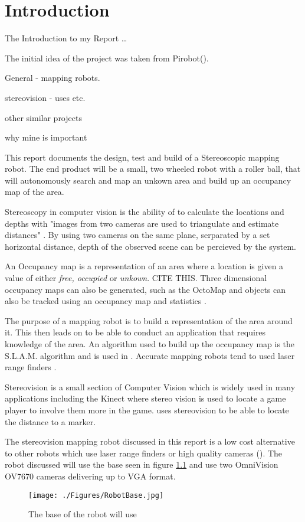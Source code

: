 \chapter{Introduction} \label{Chapter:Introduction}
The Introduction to my Report \dots

The initial idea of the project was taken from Pirobot(\cite{Pirobot}).

General - mapping robots. 

stereovision - uses etc.

other similar projects

why mine is important 


This report documents the design, test and build of a Stereoscopic mapping robot. The end product will be a small, two wheeled robot with a roller ball, that will autonomously search and map an unkown area and build up an occupancy map of the area. 

Stereoscopy in computer vision is the ability of to calculate the locations and depths with "images from two cameras are used to triangulate and estimate distances" \cite{Saxena:DepthEstimation}. By using two cameras on the same plane, serparated by a set horizontal distance, depth of the observed scene can be percieved by the system.

An Occupancy map is a representation of an area where a location is given a value of either \textit{free, occupied} or \textit{unkown}. CITE THIS. Three dimensional occupancy maps can also be generated, such as the OctoMap\cite{octomap} and objects can also be tracked using an occupancy map and statistics \cite{Fleuret:OccupancyMap}. 

The purpose of a mapping robot is to build a representation of the area around it. This then leads on to be able to conduct an application that requires knowledge of the area. An algorithm used to build up the occupancy map is the S.L.A.M. algorithm \cite{Thrun:SLAM} and is used in \cite{Se:MappingRobot}. Accurate mapping robots tend to used laser range finders \cite{Ruhnke:LaserMapping}.

Stereovision is a small section of Computer Vision which is widely used in many applications including the Kinect \cite{Microsoft:Kinect} where stereo vision is used to locate a game player to involve them more in the game. \cite{Mrovlje:Distance_Stereoscopic} uses stereovision to be able to locate the distance to a marker.

The stereovision mapping robot discussed in this report is a low cost alternative to other robots which use laser range finders or high quality cameras (\cite{Se:MappingRobot}). The robot discussed will use the base seen in figure \ref{fig:RobotBase} and use two OmniVision OV7670 cameras delivering up to VGA format.

\begin{figure}
\texttt{[image: ./Figures/RobotBase.jpg]}
\caption{The base of the robot will use}
\label{fig:RobotBase}
\end{figure}